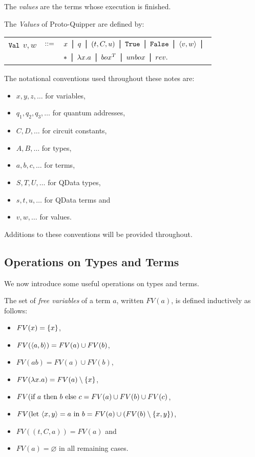 \documentclass{article}
\begin{document}
The \emph{values} are the terms whose execution is finished.

\begin{definition}
The \emph{Values} of Proto-Quipper are defined by:
\begin{center}
\begin{tabular}{rcl}
$\texttt{Val}$ $v,w$ & $::=$ & $x \bor q \bor (t,C,u) \bor \true \bor 
  \false \bor \p{v,w} \bor$ \\
& & $* \bor \lambda x.a  \bor box^T \bor unbox \bor rev.$
\end{tabular}
\end{center}
\end{definition}

The notational conventions used throughout these notes are:
\begin{itemize}
  \item $x,y,z,\ldots$ for variables,
  \item $q_1,q_2,q_3,\ldots$ for quantum addresses,
  \item $C,D,\ldots$ for circuit constants,
  \item $A,B,\ldots$ for types,
  \item $a,b,c,\ldots$ for terms,
  \item $S,T,U,\ldots$ for QData types,
  \item $s,t,u,\ldots$ for QData terms and
  \item $v,w,\ldots$ for values.
\end{itemize}
Additions to these conventions will be provided throughout.


\subsection{Operations on Types and Terms}

We now introduce some useful operations on types and terms. 

\begin{definition}
The set of \emph{free variables} of a term $a$, written $FV(a)$, 
is defined inductively as follows:
\begin{itemize}
  \item $FV(x)=\{x\}$,
  \item $FV(\langle a,b\rangle)=FV(a)\cup FV(b)$,
  \item $FV(ab)=FV(a)\cup FV(b)$,
  \item $FV(\lambda x.a)=FV(a)\setminus\{x\}$,
  \item $FV(\text{if}~ a ~\text{then}~ b ~\text{else}~ c = FV(a) \cup FV(b) \cup FV(c)$,
  \item $FV(\text{let}~ \langle x,y\rangle = a ~\text{in}~ b= FV(a)\cup (FV(b)\setminus \{x,y\})$,
  \item $FV((t,C,a))= FV(a)$ and
  \item $FV(a)=\varnothing$ in all remaining cases.
\end{itemize}
\end{definition}
\end{document}
